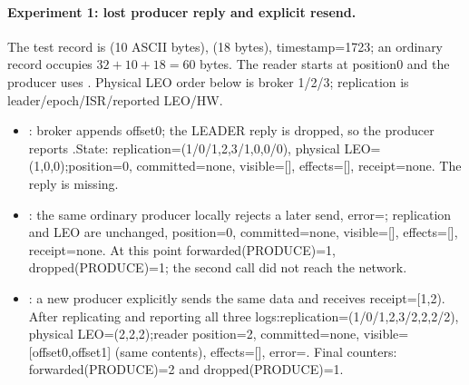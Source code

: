 \paragraph{Experiment 1: lost producer reply and explicit resend.}The test record is  (10 ASCII bytes),  (18 bytes), timestamp=1723; an ordinary record occupies \(32+10+18=60\) bytes. The reader starts at position0 and the producer uses . Physical LEO order below is broker 1/2/3; replication is leader/epoch/ISR/reported LEO/HW.
\begin{itemize}
\item {}: broker appends offset0; the LEADER reply is dropped, so the producer reports .\newline State: replication=(1/0/{1,2,3}/{1,0,0}/0), physical LEO=(1,0,0);\newline position=0, committed=none, visible=[], effects=[], receipt=none. The reply is missing.
\item {}: the same ordinary producer locally rejects a later send, error=; replication and LEO are unchanged, position=0, committed=none, visible=[], effects=[], receipt=none. At this point forwarded(PRODUCE)=1, dropped(PRODUCE)=1; the second call did not reach the network.
\item {}: a new producer explicitly sends the same data and receives receipt=[1,2). After replicating and reporting all three logs:\newline replication=(1/0/{1,2,3}/{2,2,2}/2), physical LEO=(2,2,2);\newline reader position=2, committed=none, visible=[offset0,offset1] (same contents), effects=[], error=. Final counters: forwarded(PRODUCE)=2 and dropped(PRODUCE)=1.
\end{itemize}
